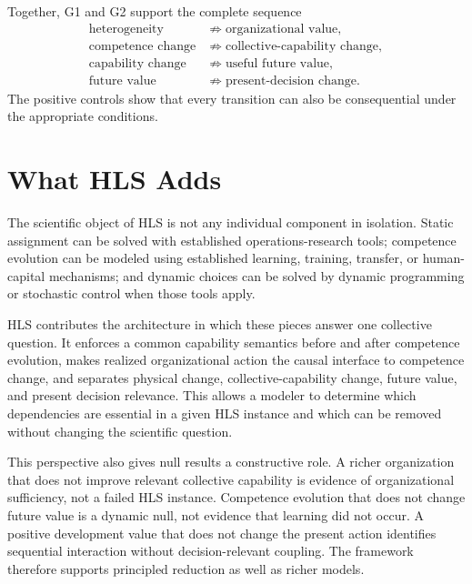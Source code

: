 \documentclass[10pt]{article}
\begin{document}
Together, G1 and G2 support the complete sequence
\begin{equation}
\begin{split}
\text{heterogeneity}
&\not\Rightarrow \text{organizational value},\\
\text{competence change}
&\not\Rightarrow \text{collective-capability change},\\
\text{capability change}
&\not\Rightarrow \text{useful future value},\\
\text{future value}
&\not\Rightarrow \text{present-decision change}.
\end{split}
\label{eq:nullchain}
\end{equation}
The positive controls show that every transition can also be consequential under the appropriate conditions.

\section{What HLS Adds}

The scientific object of HLS is not any individual component in isolation. Static assignment can be solved with established operations-research tools; competence evolution can be modeled using established learning, training, transfer, or human-capital mechanisms; and dynamic choices can be solved by dynamic programming or stochastic control when those tools apply.

HLS contributes the architecture in which these pieces answer one collective question. It enforces a common capability semantics before and after competence evolution, makes realized organizational action the causal interface to competence change, and separates physical change, collective-capability change, future value, and present decision relevance. This allows a modeler to determine which dependencies are essential in a given HLS instance and which can be removed without changing the scientific question.

This perspective also gives null results a constructive role. A richer organization that does not improve relevant collective capability is evidence of organizational sufficiency, not a failed HLS instance. Competence evolution that does not change future value is a dynamic null, not evidence that learning did not occur. A positive development value that does not change the present action identifies sequential interaction without decision-relevant coupling. The framework therefore supports principled reduction as well as richer models.
\end{document}
